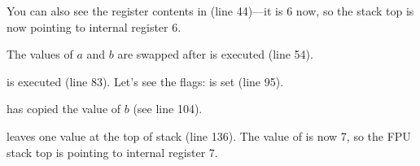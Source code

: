 You can also see the  register contents in  (line 44)---it is 6 now, 
so the stack top is now pointing to internal register 6.

The values of $a$ and $b$ are swapped after  is executed (line 54).

 is executed (line 83). 
Let's see the flags: \CF is set (line 95).

 has copied the value of $b$ (see line 104).

\FSTP leaves one value at the top of stack (line 136). 
The value of  is now 7, so the FPU stack top is pointing to internal register 7.

